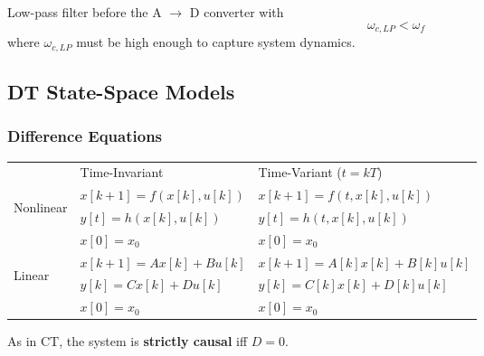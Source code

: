 
Low-pass filter before the A $\rightarrow$ D converter with
\begin{equation*}
    \omega_{c,LP} < \omega_f
\end{equation*}
where $\omega_{c,LP}$ must be high enough to capture system dynamics.

\subsection{DT State-Space Models}
\subsubsection{Difference Equations}

\renewcommand{\arraystretch}{1.3}
\setlength{\oldtabcolsep}{\tabcolsep}\setlength\tabcolsep{3pt}

\begin{tabularx}{\linewidth}{@{}lll@{}}
                                                             & Time-Invariant          & Time-Variant ($t = kT$)      \\
    \cmidrule{2-3}
    \multirow{3}{*}{\begin{sideways}Nonlinear\end{sideways}} & $x[k+1] = f(x[k],u[k])$ & $x[k+1] = f(t,x[k],u[k])$    \\
                                                             & $y[t] = h(x[k],u[k])$   & $y[t] = h(t,x[k],u[k])$      \\
                                                             & $x[0]=x_0$              & $x[0]=x_0$                   \\
    \cmidrule{2-3}
    \multirow{3}{*}{\begin{sideways}Linear\end{sideways}}    & $x[k+1] = Ax[k]+Bu[k]$  & $x[k+1] = A[k]x[k]+B[k]u[k]$ \\
                                                             & $y[k] = Cx[k]+Du[k]$    & $y[k] = C[k]x[k]+D[k]u[k]$   \\
                                                             & $x[0] = x_0$            & $x[0]=x_0$
\end{tabularx}

\renewcommand{\arraystretch}{1}
\setlength{\tabcolsep}{\oldtabcolsep}

As in CT, the system is \textbf{strictly causal} iff $D=0$.

